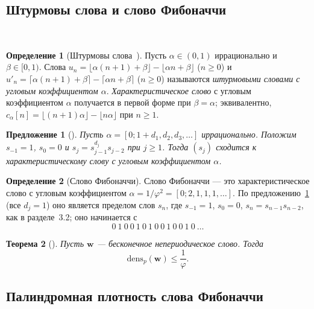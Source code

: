 \documentclass[a4paper,14pt]{extreport}
\theoremstyle{plain}
\newtheorem{theorem}{Теорема}[section]
\newtheorem{proposition}[theorem]{Предложение}
\theoremstyle{definition}
\newtheorem{definition}{Определение}[section]
\theoremstyle{remark}
\begin{document}
\subsection{Штурмовы слова и слово Фибоначчи}~\label{sec3.6.1}	

\begin{definition}[Штурмовы слова~\cite{Lothaire2002}]\label{deffSturmiann1}
	Пусть $\alpha\in(0,1)$ иррационально и $\beta\in[0,1)$. Слова
	$u_n=\lfloor\alpha(n+1)+\beta\rfloor-\lfloor\alpha n+\beta\rfloor$ ($n\ge0$) и
	$u'_n=\lceil\alpha(n+1)+\beta\rceil-\lceil\alpha n+\beta\rceil$ ($n\ge0$) называются \emph{штурмовыми словами с угловым коэффициентом $\alpha$}.
	\emph{Характеристическое слово} с угловым коэффициентом $\alpha$ получается в первой форме при $\beta=\alpha$; эквивалентно,
	$c_\alpha[n]=\lfloor(n+1)\alpha\rfloor-\lfloor n\alpha\rfloor$ при $n\ge1$.
\end{definition}

\begin{proposition}[\cite{Lothaire2002,Allouche}]\label{proirrationaln1}
	Пусть $\alpha=[0;1+d_1,d_2,d_3,\dots]$ иррационально. Положим $s_{-1}=1$, $s_0=0$ и $s_j=s_{j-1}^{d_j}s_{j-2}$ при $j\ge1$.
	Тогда $(s_j)$ сходится к характеристическому слову с угловым коэффициентом $\alpha$.
\end{proposition}

\begin{definition}[Слово Фибоначчи]\label{defffFibonaccin}
	Слово Фибоначчи --- это характеристическое слово с угловым коэффициентом $\alpha=1/\varphi^{2}=[0;2,1,1,1,\dots]$.
	По предложению~\ref{proirrationaln1} (все $d_j=1$) оно является пределом слов $s_n$, где
	$s_{-1}=1$, $s_0=0$, $s_n=s_{n-1}s_{n-2}$, как в разделе~3.2; оно начинается с
	\begin{equation}
		0\ 1\ 0\ 0\ 1\ 0\ 1\ 0\ 0\ 1\ 0\ 0\ 1\ 0\ \dots
	\end{equation}
\end{definition}

\begin{theorem}[\cite{Fischler}]\label{ThmplinDENSN1}
	Пусть $\mathbf w$ --- бесконечное непериодическое слово. Тогда
	\begin{equation}\label{eq1ThmplinDENSN1}
		\mathrm{dens}_p(\mathbf w)\le\frac1\varphi .
	\end{equation}
\end{theorem}
\subsection{Палиндромная плотность слова Фибоначчи}~\label{sec3.6.2}
\end{document}
